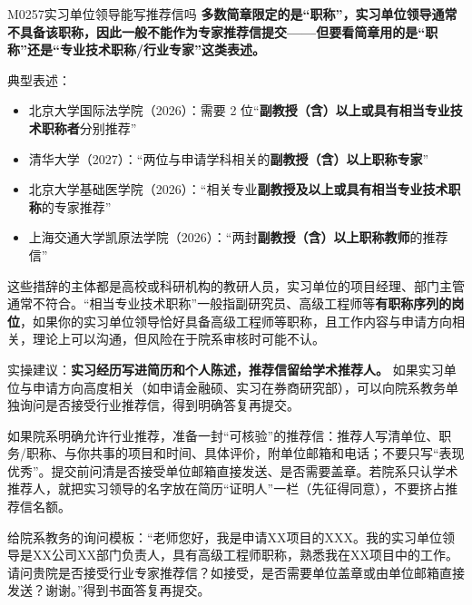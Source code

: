 \begin{qa}{M0257}{实习单位领导能写推荐信吗}
\textbf{多数简章限定的是“职称”，实习单位领导通常不具备该职称，因此一般不能作为专家推荐信提交——但要看简章用的是“职称”还是“专业技术职称/行业专家”这类表述。}

典型表述：

\begin{itemize}
  \item 北京大学国际法学院（2026）：需要 2 位“\textbf{副教授（含）以上或具有相当专业技术职称者}分别推荐”
  \item 清华大学（2027）：“两位与申请学科相关的\textbf{副教授（含）以上职称专家}”
  \item 北京大学基础医学院（2026）：“相关专业\textbf{副教授及以上或具有相当专业技术职称}的专家推荐”
  \item 上海交通大学凯原法学院（2026）：“两封\textbf{副教授（含）以上职称教师}的推荐信”
\end{itemize}

这些措辞的主体都是高校或科研机构的教研人员，实习单位的项目经理、部门主管通常不符合。“相当专业技术职称”一般指副研究员、高级工程师等\textbf{有职称序列的岗位}，如果你的实习单位领导恰好具备高级工程师等职称，且工作内容与申请方向相关，理论上可以沟通，但风险在于院系审核时可能不认。

实操建议：\textbf{实习经历写进简历和个人陈述，推荐信留给学术推荐人。} 如果实习单位与申请方向高度相关（如申请金融硕、实习在券商研究部），可以向院系教务单独询问是否接受行业推荐信，得到明确答复再提交。

如果院系明确允许行业推荐，准备一封“可核验”的推荐信：推荐人写清单位、职务/职称、与你共事的项目和时间、具体评价，附单位邮箱和电话；不要只写“表现优秀”。提交前问清是否接受单位邮箱直接发送、是否需要盖章。若院系只认学术推荐人，就把实习领导的名字放在简历“证明人”一栏（先征得同意），不要挤占推荐信名额。

给院系教务的询问模板：“老师您好，我是申请XX项目的XXX。我的实习单位领导是XX公司XX部门负责人，具有高级工程师职称，熟悉我在XX项目中的工作。请问贵院是否接受行业专家推荐信？如接受，是否需要单位盖章或由单位邮箱直接发送？谢谢。”得到书面答复再提交。
\end{qa}

